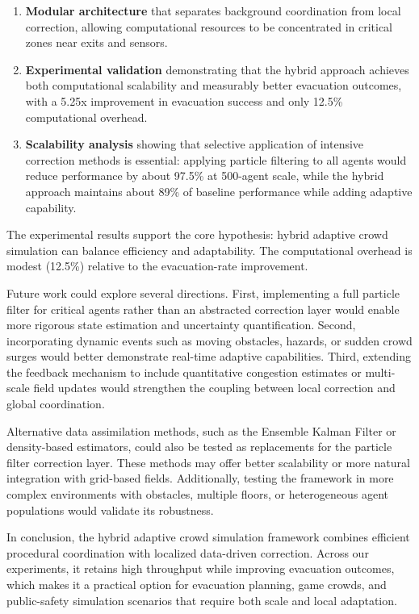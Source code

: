 \documentclass[
  11pt,
]{article}
\begin{document}
\begin{enumerate}
\def\labelenumi{\arabic{enumi}.}
\item
  \textbf{Modular architecture} that separates background coordination
  from local correction, allowing computational resources to be
  concentrated in critical zones near exits and sensors.
\item
  \textbf{Experimental validation} demonstrating that the hybrid
  approach achieves both computational scalability and measurably better
  evacuation outcomes, with a 5.25x improvement in evacuation success
  and only 12.5\% computational overhead.
\item
  \textbf{Scalability analysis} showing that selective application of
  intensive correction methods is essential: applying particle filtering
  to all agents would reduce performance by about 97.5\% at 500-agent
  scale, while the hybrid approach maintains about 89\% of baseline
  performance while adding adaptive capability.
\end{enumerate}

The experimental results support the core hypothesis: hybrid adaptive
crowd simulation can balance efficiency and adaptability. The
computational overhead is modest (12.5\%) relative to the
evacuation-rate improvement.

Future work could explore several directions. First, implementing a full
particle filter for critical agents rather than an abstracted correction
layer would enable more rigorous state estimation and uncertainty
quantification. Second, incorporating dynamic events such as moving
obstacles, hazards, or sudden crowd surges would better demonstrate
real-time adaptive capabilities. Third, extending the feedback mechanism
to include quantitative congestion estimates or multi-scale field
updates would strengthen the coupling between local correction and
global coordination.

Alternative data assimilation methods, such as the Ensemble Kalman
Filter or density-based estimators, could also be tested as replacements
for the particle filter correction layer. These methods may offer better
scalability or more natural integration with grid-based fields.
Additionally, testing the framework in more complex environments with
obstacles, multiple floors, or heterogeneous agent populations would
validate its robustness.

In conclusion, the hybrid adaptive crowd simulation framework combines
efficient procedural coordination with localized data-driven correction.
Across our experiments, it retains high throughput while improving
evacuation outcomes, which makes it a practical option for evacuation
planning, game crowds, and public-safety simulation scenarios that
require both scale and local adaptation.
\end{document}
